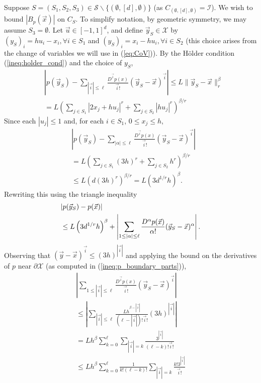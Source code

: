 \documentclass{article}
\newcommand{\sminus}{\backslash}                    %
\newcommand{\Se}{\mathcal{S}}                       %
\newcommand{\X}{\mathcal{X}}                        %
\newcommand{\vx}{\vec{x}}                           %
\newcommand{\vy}{\vec{y}}                           %
\newcommand{\vu}{\vec{u}}                           %
\newcommand{\vi}{{\vec{i}}}                         %
\begin{document}
Suppose $S = (S_1,S_2,S_3) \in \Se \sminus\{(\emptyset,[d],\emptyset)\}$
(as $C_{(\emptyset,[d],\emptyset)} = \mathcal{I}$). We wish to bound
$|B_p(\vx)|$ on $C_S$. To simplify notation, by geometric symmetry, we
may assume $S_3 = \emptyset$. Let $\vu \in [-1,1]^d$, and define $\vy_S \in \X$
by $(y_S)_i = hu_i - x_i, \forall i \in S_1$ and
$(y_S)_i = x_i - hu_i, \forall i \in S_2$ (this choice arises from the change
of variables we will use in (\ref{eq:CoV})). By the H\"{o}lder
condition (\ref{ineq:holder_cond}) and the choice of $y_S$,
\begin{align*}
 &  \left|p(\vy_S) - \sum_{|\vi| \leq \ell}
     \frac{D^\vi p(x)}{\vi!} (\vy_S - \vx)^\vi \right|
    \leq L\|\vy_S - \vx\|_r^\beta                               \\
 &  = L \left( \sum_{j \in S_1} |2x_j + hu_j|^r
                 + \sum_{j \in S_2} |hu_j|^r \right)^{\beta/r}
\end{align*}
Since each $|u_j| \leq 1$ and, for each $i \in S_1$, $0 \leq x_j \leq h$,
\begin{align*}
 &  \left|p(\vy_S) - \sum_{|\alpha| \leq \ell}
     \frac{D^\vi p(x)}{\vi!} (\vy_S - \vx)^\vi \right|\\
 &  = L \left( \sum_{j \in S_1} (3h)^r
                 + \sum_{j \in S_2} h^r \right)^{\beta/r}\\
 &  \leq L \left(d\left(3h\right)^r\right)^{\beta/r}
    = L \left(3d^{1/r} h\right)^\beta.
\end{align*}
Rewriting this using the triangle inequality
\begin{align}
\notag
 & |p(\vy_S) - p(\vx)|  \\
 & \leq L \left(3d^{1/r} h\right)^\beta
   + \left| \sum_{1 \leq |\alpha| \leq \ell}
        \frac{D^\alpha p(\vx)}{\alpha!} (\vy_S - \vx)^\alpha \right|.
\label{ineq:tribnd}
\end{align}
Observing that $(\vy - \vx)^\vi \leq (3h)^{|\vi|}$ and applying the bound on
the derivatives of $p$ near $\partial \X$ (as computed in
(\ref{ineq:p_boundary_parts})),
\begin{align*}
    \left| \sum_{1 \leq |\vi| \leq \ell}
        \frac{D^\vi p(x)}{\vi!} (\vy_S - \vx)^\vi \right|      \\
 \leq \left| \sum_{|\vi| \leq \ell}
        \frac{Lh^{\beta - |\vi|}}{(\ell - |\vi|)!\vi!} (3h)^{|\vi|} \right|   \\
 = Lh^\beta \sum_{k = 0}^\ell \sum_{|\vi| = k} \frac{3^{|\vi|}}{(\ell - k)!\vi!}    \\
 \leq Lh^\beta \sum_{k = 0}^\ell \frac{1}{k!(\ell - k)!} \sum_{|\vi| = k} \frac{k!3^{|\vi|}}{\vi!}
\end{align*}
\end{document}
